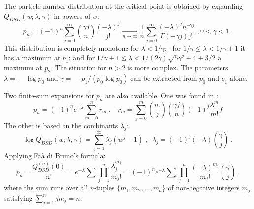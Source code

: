 \documentclass[a4paper,12pt]{amsart}
\theoremstyle{definition}
\theoremstyle{remark}
\begin{document}
The particle-number distribution at the critical point is obtained by expanding $Q_{DSD}(w;\lambda,\gamma)$ in powers of $w$:
\begin{equation}\label{eq: DSDpmf}
p_n =(-1)^n \sum_{j=0}^{\infty} \binom{\gamma j}{n}\frac{(-\lambda)^j}{j!} 
\xrightarrow[n\to\infty]{}\frac{1}{n}\sum_{j=0}^{\infty} \frac{(-\lambda)^j n^{-\gamma j}}{\Gamma(-\gamma j)j!}\;, 0<\gamma<1\;.
\end{equation} 
This distribution is completely monotone for $\lambda<1/\gamma$; ~for $1/\gamma\leq\lambda<1/\gamma+1$ it has a maximum at $p_1$; and for $1/\gamma+1\leq \lambda<1/(2\gamma) \sqrt{5 \gamma ^2+4}+3/2$ a maximum at $p_2$. The situation for $n>2$ is more complex.  
The parameters $\lambda\!=\!-\log p_0$ and $\gamma\!=\!-p_1/(p_0 \log p_0)$ can be extracted from $p_0$ and $p_1$ alone.

Two finite-sum expansions for $p_n$ are also available. One was found in  \cite{Christoph1998a}:
\begin{equation}
    p_n=(-1)^n e^{-\lambda}\sum_{m=0}^{n}r_m\;,\;\;\; r_m=\sum_{j=0}^{m} \binom{m}{j}\binom{\gamma j}{n} (-1)^j \frac{\lambda^m}{m!}f
\end{equation}
The other is based on the combinants $\lambda_j$: 
\begin{equation}\label{DSDcum}
 \log Q_{DSD}(w;\lambda,\gamma)
 =\sum_{j=1}^{\infty}\lambda_j (w^j-1)
 \;,\;\; \lambda_j=  (-1)^{j} (-\lambda)  \binom{\gamma }{j}\;. 
\end{equation}
Applying Fa\`a di Bruno's formula:
\begin{equation}\label{FaaDSD}
p_n = \frac{Q_{DSD}^{(n)}(0)}{n!} = e^{-\lambda} \sum  \prod_{j=1}^{n}\frac{\lambda_j^{m_j}}{m_j!}=
(-1)^n e^{-\lambda}\sum \prod_{j=1}^{n}\frac{(-\lambda)^{m_j}}{m_j!}\binom{\gamma}{j}\;.
\end{equation}
where the sum runs over all $n$-tuples $\{m_1,m_2,\ldots, m_n\}$ of non-negative integers $m_j$ satisfying $\sum_{j=1}^{n} j m_j =n$.
\end{document}
